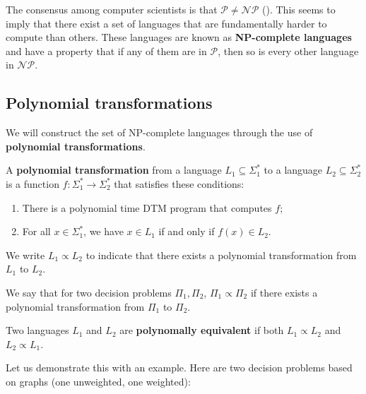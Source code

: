The consensus among computer scientists is that $\mathcal{P} \neq \mathcal{NP}$ (\cite{AroraSanjeev2009Cc:a}). This seems to imply that there exist a set of languages that are fundamentally harder to compute than others. These languages are known as \textbf{NP-complete languages} and have a property that if any of them are in $\mathcal{P}$, then so is every other language in $\mathcal{NP}$.

\subsection{Polynomial transformations}

We will construct the set of NP-complete languages through the use of \textbf{polynomial transformations}.

\begin{definition}
    A \textbf{polynomial transformation} from a language $L_1 \subseteq \Sigma_1^*$ to a language $L_2 \subseteq \Sigma_2^*$ is a function $f:\Sigma_1^* \to \Sigma_2^*$ that satisfies these conditions:
    \begin{enumerate}
        \item There is a polynomial time DTM program that computes $f$;
        \item For all \(x \in \Sigma_1^*\), we have \(x \in L_1\) if and only if \(f(x) \in L_2\).
    \end{enumerate}

    We write \(L_1 \propto L_2\) to indicate that there exists a polynomial transformation from $L_1$ to $L_2$.
\end{definition}

\begin{remark}
    We say that for two decision problems $\Pi_1, \Pi_2$, $\Pi_1 \propto \Pi_2$ if there exists a polynomial transformation from $\Pi_1$ to $\Pi_2$.
\end{remark}

\begin{definition}
    Two languages $L_1$ and $L_2$ are \textbf{polynomally equivalent} if both $L_1 \propto L_2$ and $L_2 \propto L_1$.
\end{definition}

Let us demonstrate this with an example. Here are two decision problems based on graphs (one unweighted, one weighted):



